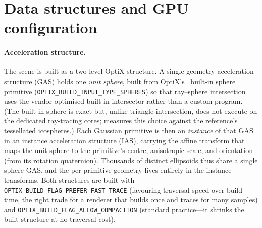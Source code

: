 \section{Data structures and GPU configuration}
\label{sec:gpu-impl}

\paragraph{Acceleration structure.} The scene is built as a two-level OptiX structure. A single
geometry acceleration structure (GAS) holds one \emph{unit sphere}, built from OptiX's~\cite{Optix} built-in sphere
primitive (\texttt{OPTIX\_BUILD\_INPUT\_TYPE\_SPHERES}) so that ray--sphere intersection uses the
vendor-optimised built-in intersector rather than a custom program. (The built-in sphere is exact but,
unlike triangle intersection, does not execute on the dedicated ray-tracing cores;
 measures this choice against the reference's tessellated icospheres.) Each Gaussian primitive is then an \emph{instance} of that
GAS in an instance acceleration structure (IAS), carrying the affine transform that maps the unit
sphere to the primitive's centre, anisotropic scale, and orientation (from its rotation quaternion).
Thousands of distinct ellipsoids thus share a single sphere GAS, and the per-primitive geometry lives
entirely in the instance transforms. Both structures are built with
\texttt{OPTIX\_BUILD\_FLAG\_PREFER\_FAST\_TRACE} (favouring traversal speed over build time, the right
trade for a renderer that builds once and traces for many samples) and
\texttt{OPTIX\_BUILD\_FLAG\_ALLOW\_COMPACTION} (standard practice---it shrinks the built
structure at no traversal cost).

